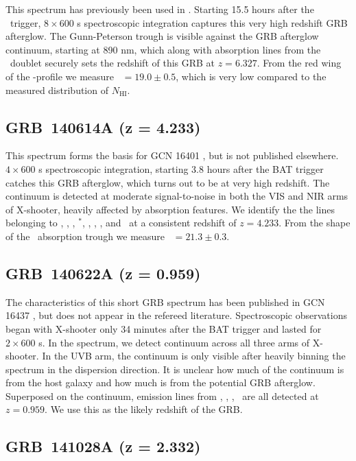 \documentclass[longauth]{aa}    %
\begin{document}
This spectrum has previously been used in \citet{Melandri2015}. Starting 15.5
hours after the \swift~trigger, $8\times600$ s spectroscopic integration
captures this very high redshift GRB afterglow. The Gunn-Peterson trough is
visible against the GRB afterglow continuum, starting at 890 nm, which along
with absorption lines from the \mgii~doublet securely sets the redshift of this
GRB at $z = 6.327$. From the red wing of the \lya-profile we measure \nh~$=19.0
\pm 0.5$, which is very low compared to the measured distribution of
$N_{\mathrm{HI}}$.

\subsection{GRB~140614A (z = 4.233)}\label{140614}

This spectrum forms the basis for GCN 16401 \citep{GCN16401}, but is not
published elsewhere. $4\times600$ s spectroscopic integration, starting 3.8
hours after the BAT trigger catches this GRB afterglow, which turns out to be at
very high redshift. The continuum is detected at moderate signal-to-noise in
both the VIS and NIR arms of X-shooter, heavily affected by absorption features.
We identify the the lines belonging to \lya, \SIii, \cii, \cii$^*$, \alii,
\aliii, \feii, and \mgii~at a consistent redshift of $z = 4.233$. From the shape
of the \lya~absorption trough we measure \nh~$=21.3 \pm 0.3$.

\subsection{GRB~140622A (z = 0.959)}\label{140622}

The characteristics of this short \citep[T90 = $0.13 \pm 0.04$
s;][]{Lien2016} GRB spectrum has been published in GCN 16437 \citep{GCN16437},
but does not appear in the refereed literature. Spectroscopic observations began
with X-shooter only 34 minutes after the BAT trigger and lasted for $2\times600$
s. In the spectrum, we detect continuum across all three arms of X-shooter. In
the UVB arm, the continuum is only visible after heavily binning the spectrum in
the dispersion direction. It is unclear how much of the continuum is from the
host galaxy and how much is from the potential GRB afterglow. Superposed on the
continuum, emission lines from \oii, \hb, \oiii, \ha~are all detected at $z =
0.959$. We use this as the likely redshift of the GRB.

\subsection{GRB~141028A (z = 2.332)}\label{141028}
\end{document}
